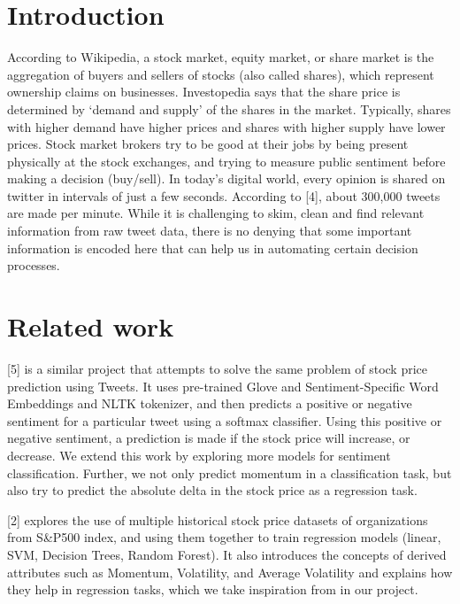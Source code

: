 \documentclass{article}
\begin{document}
\section{Introduction}
According to Wikipedia, a stock market, equity market, or share market is the aggregation of buyers and sellers of stocks (also called shares), which represent ownership claims on businesses. Investopedia says that the share price is determined by ‘demand and supply’ of the shares in the market. Typically, shares with higher demand have higher prices and shares with higher supply have lower prices. Stock market brokers try to be good at their jobs by being present physically at the stock exchanges, and trying to measure public sentiment before making a decision (buy/sell). In today's digital world, every opinion is shared on twitter in intervals of just a few seconds. According to [4], about 300,000 tweets are made per minute. While it is challenging to skim, clean and find relevant information from raw tweet data, there is no denying that some important information is encoded here that can help us in automating certain decision processes.

\section{Related work}
[5] is a similar project that attempts to solve the same problem of stock price prediction using Tweets. It uses pre-trained Glove and Sentiment-Specific Word Embeddings and NLTK tokenizer, and then predicts a positive or negative sentiment for a particular tweet using a softmax classifier. Using this positive or negative sentiment, a prediction is made if the stock price will increase, or decrease. We extend this work by exploring more models for sentiment classification. Further, we not only predict momentum in a classification task, but also try to predict the absolute delta in the stock price as a regression task.

[2] explores the use of multiple historical stock price datasets of organizations from S\&P500 index, and using them together to train regression models (linear, SVM, Decision Trees, Random Forest). It also introduces the concepts of derived attributes such as Momentum, Volatility, and Average Volatility and explains how they help in regression tasks, which we take inspiration from in our project. 
\end{document}
